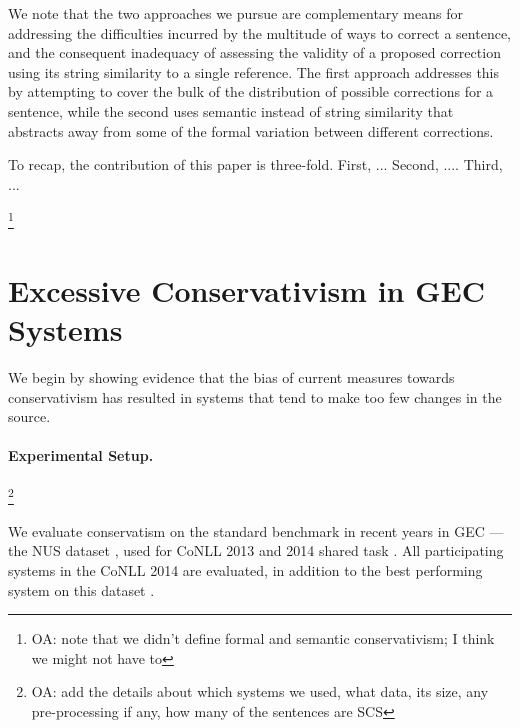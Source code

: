\documentclass[english]{article}
\newcommand{\oa}[1]{\footnote{\color{red}OA: #1}}
\begin{document}
We note that the two approaches we pursue are complementary means for addressing the difficulties
incurred by the multitude of ways to correct a sentence, and the consequent inadequacy of assessing
the validity of a proposed correction using its string similarity to a single reference.
The first approach addresses this by attempting to cover the bulk of the distribution of possible
corrections for a sentence, while the second uses semantic instead of string similarity that abstracts
away from some of the formal variation between different corrections.

To recap, the contribution of this paper is three-fold.
First, ...
Second, ....
Third, ...

\oa{note that we didn't define formal and semantic conservativism; I think we might not have to}

\section{Excessive Conservativism in GEC Systems}\label{sec:formal_conservatism}



We begin by showing evidence that the bias of current measures towards conservativism
has resulted in systems that tend to make too few changes in the source. 

\paragraph{Experimental Setup.}\oa{add the details about which systems we used, what data, its size,
  any pre-processing if any, how many of the sentences are SCS}

We evaluate conservatism on the standard benchmark in recent years in GEC ---
the NUS dataset \cite{}, used for CoNLL 2013 and 2014 shared task \cite{kao2013conll,ng2014conll}.
All participating systems in the CoNLL 2014 are evaluated, in addition to the
best performing system on this dataset \cite{rozovskaya2014building}.
\end{document}
